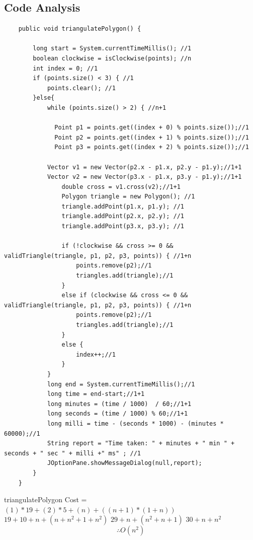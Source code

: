 \documentclass[conference]{IEEEtran}
\begin{document}
\subsection{Code Analysis}
\begin{lstlisting}
    public void triangulatePolygon() {
      
        long start = System.currentTimeMillis(); //1
        boolean clockwise = isClockwise(points); //n
        int index = 0; //1
        if (points.size() < 3) { //1
            points.clear(); //1
        }else{
            while (points.size() > 2) { //n+1

              Point p1 = points.get((index + 0) % points.size());//1
              Point p2 = points.get((index + 1) % points.size());//1
              Point p3 = points.get((index + 2) % points.size());//1

            Vector v1 = new Vector(p2.x - p1.x, p2.y - p1.y);//1+1
            Vector v2 = new Vector(p3.x - p1.x, p3.y - p1.y);//1+1
                double cross = v1.cross(v2);//1+1
                Polygon triangle = new Polygon(); //1
                triangle.addPoint(p1.x, p1.y); //1
                triangle.addPoint(p2.x, p2.y); //1
                triangle.addPoint(p3.x, p3.y); //1

                if (!clockwise && cross >= 0 && validTriangle(triangle, p1, p2, p3, points)) { //1+n
                    points.remove(p2);//1
                    triangles.add(triangle);//1
                }
                else if (clockwise && cross <= 0 && validTriangle(triangle, p1, p2, p3, points)) { //1+n
                    points.remove(p2);//1
                    triangles.add(triangle);//1
                }
                else {
                    index++;//1
                }
            }
            long end = System.currentTimeMillis();//1
            long time = end-start;//1+1
            long minutes = (time / 1000)  / 60;//1+1
            long seconds = (time / 1000) % 60;//1+1
            long milli = time - (seconds * 1000) - (minutes * 60000);//1
            String report = "Time taken: " + minutes + " min " + seconds + " sec " + milli +" ms" ; //1
            JOptionPane.showMessageDialog(null,report);
        }
    }
\end{lstlisting}
triangulatePolygon Cost =
\newline
$(1)*19 +(2)*5+(n)+((n+1)*(1+n))$
\newline
$19+10+n+(n+n^2+1+n^2)$
\newline
$29+n+(n^2+n+1)$
$30+n+n^2$
$$\therefore O(n^2)$$
\end{document}
